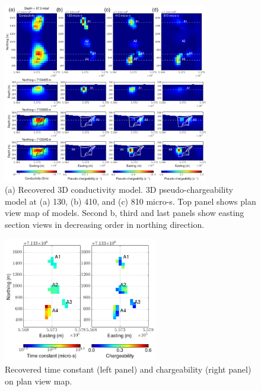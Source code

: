 \documentclass[letterpaper,11pt]{article}
\begin{document}
\begin{figure}[htb]
  \centering
  \includegraphics[width=0.8\textwidth]{figures/PetaSections.png}
  \caption{(a) Recovered 3D conductivity model. 3D pseudo-chargeability model at (a) 130, (b) 410, and (c) 810 micro-s. Top panel shows plan view map of models. Second b, third and last panels show easting section views in decreasing order in northing direction. }
  \label{Fig:PetaSections}
\end{figure}
\begin{figure}[htb]
  \centering
  \includegraphics[width=0.6\textwidth]{figures/tauetamap.png}
  \caption{Recovered time constant (left panel) and chargeability (right panel) on plan view map. }
  \label{Fig:tauetamap}
\end{figure}
\clearpage
\end{document}
